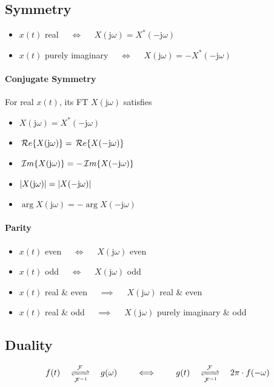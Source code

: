 \documentclass[10pt,UTF8]{article}
\newenvironment{definition box}
{\begin{tcolorbox}[colback=blue!5!white,colframe=blue!75!black,parbox=false,before upper=\par,before lower=\par]}
{\end{tcolorbox}}
\newenvironment{theorem box}
{\begin{tcolorbox}[colback=yellow!5!white,colframe=yellow!75!black,parbox=false,before upper=\par,before lower=\par]}
{\end{tcolorbox}}
\theoremstyle{definition}
\newtheorem{definition inner}{Definition}[section]
\theoremstyle{plain}
\newtheorem{theorem inner}{Theorem}[section]
\theoremstyle{definition}
\newtheorem*{proof inner}{\textit{Proof}}
\theoremstyle{remark}
\newcommand{\ju}{\mathrm{j}}  %
\renewcommand{\Re}{\,\mathcal{R}\ensuremath{e}\qty}
\renewcommand{\Im}{\,\mathcal{I}\ensuremath{m}\qty}
\begin{document}
\subsection{Symmetry}

\begin{itemize}
    \item $x(t)$ real $\quad\iff\quad$ $X(\ju\omega)=X^\ast(-\ju\omega)$
    \item $x(t)$ purely imaginary $\quad\iff\quad$ $X(\ju\omega)=-X^\ast(-\ju\omega)$
\end{itemize}

\paragraph{Conjugate Symmetry}
For real $x(t)$, its FT $X(\ju\omega)$ satisfies
\begin{itemize}
    \item $X(\ju\omega) = X^\ast(-\ju\omega)$
    \item $\Re{X(\ju\omega)} = \Re{X(-\ju\omega)}$
    \item $\Im{X(\ju\omega)} = -\Im{X(-\ju\omega)}$
    \item $\abs{X(\ju\omega)} = \abs{X(-\ju\omega)}$
    \item $\arg X(\ju\omega) = -\arg X(-\ju\omega)$
\end{itemize}

\paragraph{Parity}
\begin{itemize}
    \item $x(t)$ even $\quad\iff\quad$ $X(\ju\omega)$ even
    \item $x(t)$ odd $\quad\iff\quad$ $X(\ju\omega)$ odd
    \item $x(t)$ real \& even $\quad\implies\quad$
        $X(\ju\omega)$ real \& even
    \item $x(t)$ real \& odd $\quad\implies\quad$
        $X(\ju\omega)$ purely imaginary \& odd
\end{itemize}

\subsection{Duality}
\begin{equation*}
    f(t)
    \quad\xrightleftharpoons[\mathcal{F}^{-1}]{\mathcal{F}}\quad
    g(\omega)
    \qquad\iff\qquad
    g(t)
    \quad\xrightleftharpoons[\mathcal{F}^{-1}]{\mathcal{F}}\quad
    2\pi\cdot f(-\omega)
\end{equation*}
\end{document}
